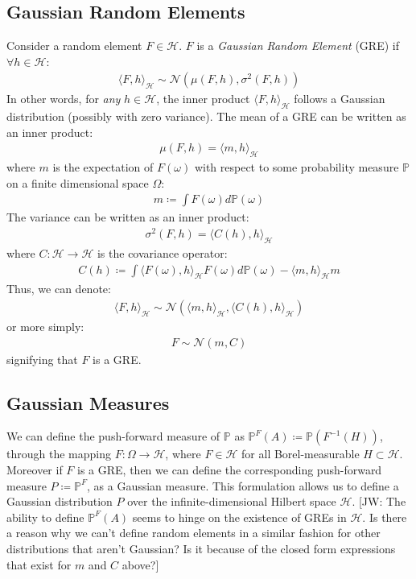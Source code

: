 \documentclass[twoside,11pt]{article}
\newcommand{\jw}[1]{{\color{gray} [JW: #1]}}
\begin{document}
\subsection{Gaussian Random Elements}
 Consider a random element $F \in \mathcal{H}$. $F$ is a \textit{Gaussian Random Element} (GRE) if $\forall h \in \mathcal{H}$:
\begin{align}
    \langle F, h \rangle_\mathcal{H} \sim \mathcal{N}(\mu(F, h), \sigma^2(F, h))
\end{align}
In other words, for \textit{any} $h \in \mathcal{H}$, the inner product $\langle F, h \rangle_\mathcal{H}$ follows a Gaussian distribution (possibly with zero variance). The mean of a GRE can be written as an inner product:
\begin{align}
\mu(F, h) = \langle m, h\rangle_{\mathcal{H}}
\end{align}
where $m$ is the expectation of $F(\omega)$ with respect to some probability measure $\mathbb{P}$ on a finite dimensional space $\Omega$:
\begin{align}
    m \coloneqq \int F(\omega) d \mathbb{P}(\omega)
\end{align}
The variance can be written as an inner product:
\begin{align}
\sigma^2(F, h) = \langle C(h), h\rangle_{\mathcal{H}}
\end{align}
where $C: \mathcal{H} \rightarrow \mathcal{H}$ is the covariance operator:
\begin{align}
    C(h) \coloneqq \int \langle F(\omega), h\rangle_{\mathcal{H}} F(\omega)d \mathbb{P}(\omega) - \langle m, h\rangle_{\mathcal{H}} m 
\end{align}
Thus, we can denote:
\begin{align}
    \langle F, h\rangle_{\mathcal{H}} \sim \mathcal{N}\left(  \langle m, h\rangle_{\mathcal{H}},  \langle C(h), h\rangle_{\mathcal{H}}\right)
\end{align}
or more simply:
\begin{align}
    F \sim \mathcal{N}(m, C)
\end{align}
signifying that $F$ is a GRE.
\subsection{Gaussian Measures \cite{wild2022generalized}}
We can define the push-forward measure of $\mathbb{P}$ as $\mathbb{P}^{F}(A) \coloneqq \mathbb{P}(F^{-1}(H))$, through the mapping $F: \Omega \rightarrow \mathcal{H}$, where $F \in \mathcal{H}$ for all Borel-measurable $H \subset \mathcal{H}$. Moreover if $F$ is a GRE, then we can define the corresponding push-forward measure $P \coloneqq \mathbb{P}^{F}$, as a Gaussian measure. This formulation allows us to define a Gaussian distribution $P$ over the infinite-dimensional Hilbert space $\mathcal{H}$. \jw{The ability to define $\mathbb{P}^{F}(A)$ seems to hinge on the existence of GREs in $\mathcal{H}$. Is there a reason why we can't define random elements in a similar fashion for other distributions that aren't Gaussian? Is it because of the closed form expressions that exist for $m$ and $C$ above?}
\end{document}
